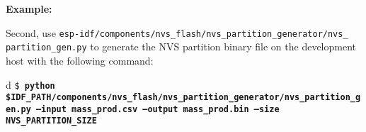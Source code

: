 \documentclass[a4paper,12pt]{book}
\begin{document}
\vspace{6pt}
\textcolor{Title}{\large\bfseries Example:}

Second, use \texttt{esp-idf/components/nvs\_flash/nvs\_partition\_generator/nvs\_\\
partition\_gen.py} to generate the NVS partition binary file on the development host with the following command:

\begin{tabular}{d}
\footnotesize\texttt{\$ \bfseries python \$IDF\_PATH/components/nvs\_flash/nvs\_partition\_generator/nvs\_partition\_\newline gen.py --input\ mass\_prod.csv --output mass\_prod.bin --size NVS\_PARTITION\_SIZE}
\end{tabular}
\end{document}
